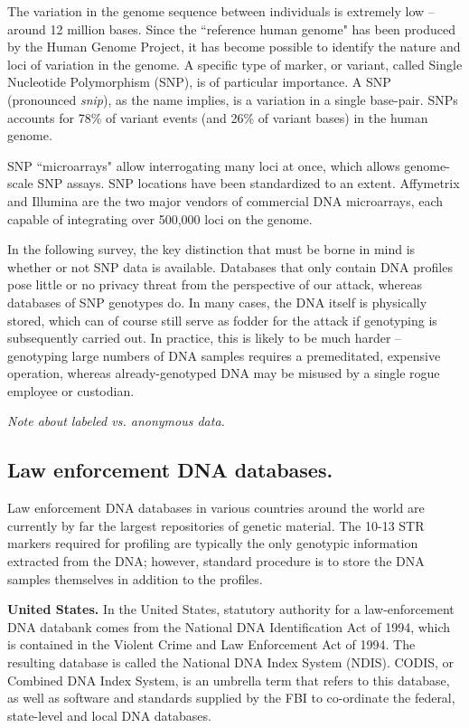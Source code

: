 \documentclass{article}
\begin{document}
The variation in the genome sequence between individuals is extremely low -- around 12 million bases.  Since the ``reference human genome" has been produced by the Human Genome Project, it has become possible to identify the nature and loci of variation in the genome. A specific type of marker, or variant, called Single Nucleotide Polymorphism (SNP), is of particular importance.  A SNP (pronounced {\em snip}), as the name implies, is a variation in a single base-pair.  SNPs accounts for 78\% of variant events (and 26\% of variant bases) in the human genome.  

SNP ``microarrays" allow interrogating many loci at once, which allows genome-scale SNP assays.  SNP locations have been standardized to an extent. Affymetrix and Illumina are the two major vendors of commercial DNA microarrays, each capable of integrating over 500,000 loci on the genome.

In the following survey, the key distinction that must be borne in mind is whether or not SNP data is available. Databases that only contain DNA profiles pose little or no privacy threat from the perspective of our attack, whereas databases of SNP genotypes do. In many cases, the DNA itself is physically stored, which can of course still serve as fodder for the attack if genotyping is subsequently carried out. In practice, this is likely to be much harder -- genotyping large numbers of DNA samples requires a premeditated, expensive operation, whereas already-genotyped DNA may be misused by a single rogue employee or custodian.


{\em Note about labeled vs. anonymous data.}


\subsection{Law enforcement DNA databases.}
Law enforcement DNA databases in various countries around the world are currently by far the largest repositories of genetic material.  The 10-13 STR markers required for profiling are typically the only genotypic information extracted from the DNA; however, standard procedure is to store the DNA samples themselves in addition to the profiles.

{\bf United States.} In the United States, statutory authority for a law-enforcement DNA databank comes from the National DNA Identification Act of 1994, which is contained in the Violent Crime and Law Enforcement Act of 1994. The resulting database is called the National DNA Index System (NDIS). CODIS, or Combined DNA Index System, is an umbrella term that refers to this database, as well as software and standards supplied by the FBI to co-ordinate the federal, state-level and local DNA databases.
\end{document}
